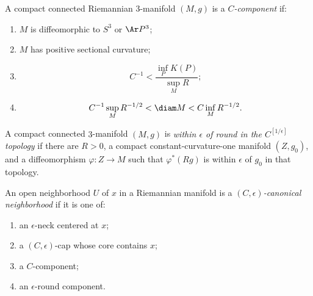 \begin{definition}[$C$-component]\label{def:c-component}
\label{Ccomponent}
A compact connected Riemannian $3$-manifold $(M,g)$ is a
\emph{$C$-component} if:
\begin{enumerate}
\item[(1)] $M$ is diffeomorphic to $S^3$ or $\Ar P^3$;
\item[(2)] $M$ has positive sectional curvature;
\item[(3)]
\[
 C^{-1}<\frac{\inf_PK(P)}{\sup_MR};
\]
\item[(4)]
\[
 C^{-1}\sup_MR^{-1/2}<\diam M<C\inf_MR^{-1/2}.
\]
\end{enumerate}
\end{definition}

\begin{definition}\label{def:epsilon-round-component}
\label{defnepsround}
A compact connected $3$-manifold $(M,g)$ is
\emph{within $\epsilon$ of round in the $C^{[1/\epsilon]}$ topology}
if there are $R>0$, a compact constant-curvature-one manifold
$(Z,g_0)$, and a diffeomorphism $\varphi:Z\to M$ such that
$\varphi^*(Rg)$ is within $\epsilon$ of $g_0$ in that topology.
\end{definition}

\begin{definition}\label{def:canonical-neighborhood}
An open neighborhood $U$ of $x$ in a Riemannian manifold is a
\emph{$(C,\epsilon)$-canonical neighborhood} if it is one of:
\begin{enumerate}
\item[(1)] an $\epsilon$-neck centered at $x$;
\item[(2)] a $(C,\epsilon)$-cap whose core contains $x$;
\item[(3)] a $C$-component;
\item[(4)] an $\epsilon$-round component.
\end{enumerate}
\end{definition}

